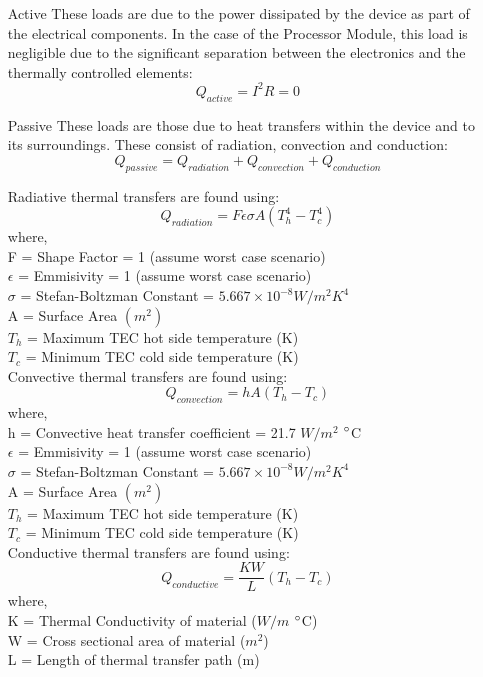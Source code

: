 \begin{enumerate}
	\item [Active] These loads are due to the power dissipated by the device as part of the electrical components. In the case of the Processor Module, this load is negligible due to the significant separation between the electronics and the thermally controlled elements:
	$$Q_{active} = I^2R = 0 $$ 
	\item[Passive] These loads are those due to heat transfers within the device and to its surroundings. These consist of radiation, convection and conduction:
	\begin{equation}
	\label{eq_passive}
	Q_{passive} = Q_{radiation} + Q_{convection} + Q_{conduction}
	\end{equation}
	
	Radiative thermal transfers are found using:
	\begin{equation}
	\label{eq_rad}
	Q_{radiation} = F\epsilon\sigma A(T_h^4 - T_c^4)
	\end{equation} 	
	where,\\
	F = Shape Factor = 1 (assume worst case scenario)\\
	$\epsilon$ = Emmisivity = 1 (assume worst case scenario)\\
	$\sigma$ = Stefan-Boltzman Constant = $5.667\times10^{-8} W/m^2K^4$\\
	A = Surface Area $(m^2)$\\
	$T_h$ = Maximum TEC hot side temperature (K)\\
	$T_c$ =  Minimum TEC cold side temperature (K)\\
	
	Convective thermal transfers are found using:
	\begin{equation}
	\label{eq_cov}
	Q_{convection} = hA(T_h - T_c)
	\end{equation} 	
	where,\\
	h = Convective heat transfer coefficient = 21.7 $W/m^2$ $\degree$C\\
	$\epsilon$ = Emmisivity = 1 (assume worst case scenario)\\
	$\sigma$ = Stefan-Boltzman Constant = $5.667\times10^{-8} W/m^2K^4$\\
	A = Surface Area $(m^2)$\\
	$T_h$ = Maximum TEC hot side temperature (K)\\
	$T_c$ = Minimum TEC cold side temperature (K)\\

	Conductive thermal transfers are found using:
	\begin{equation}
	\label{eq_cond}
	Q_{conductive} = \frac{KW}{L}(T_h - T_c)
	\end{equation} 	
	where,\\
	K = Thermal Conductivity of material ($W/m$ $\degree$C)\\
	W = Cross sectional area of material ($m^2$)\\
	L = Length of thermal transfer path (m)\\

	
	
	
	 
\end{enumerate}

